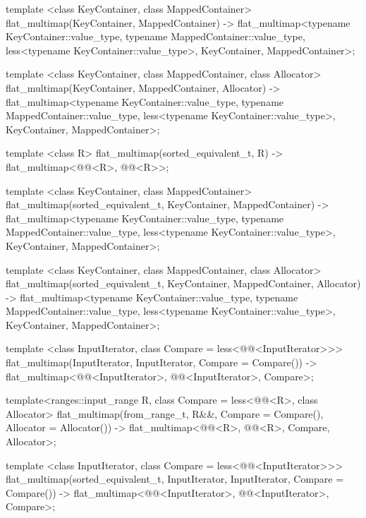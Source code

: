 \begin{addedblock}
\begin{codeblock}
{  template <class KeyContainer, class MappedContainer>
    flat_multimap(KeyContainer, MappedContainer)
      -> flat_multimap<typename KeyContainer::value_type,
                       typename MappedContainer::value_type,
                       less<typename KeyContainer::value_type>,
                       KeyContainer, MappedContainer>;

  template <class KeyContainer, class MappedContainer, class Allocator>
    flat_multimap(KeyContainer, MappedContainer, Allocator)
      -> flat_multimap<typename KeyContainer::value_type,
                       typename MappedContainer::value_type,
                       less<typename KeyContainer::value_type>,
                       KeyContainer, MappedContainer>;

  template <class R>
    flat_multimap(sorted_equivalent_t, R)
      -> flat_multimap<@@<R>, @@<R>>;

  template <class KeyContainer, class MappedContainer>
    flat_multimap(sorted_equivalent_t, KeyContainer, MappedContainer)
      -> flat_multimap<typename KeyContainer::value_type,
                       typename MappedContainer::value_type,
                       less<typename KeyContainer::value_type>,
                       KeyContainer, MappedContainer>;

  template <class KeyContainer, class MappedContainer, class Allocator>
    flat_multimap(sorted_equivalent_t, KeyContainer, MappedContainer, Allocator)
      -> flat_multimap<typename KeyContainer::value_type,
                       typename MappedContainer::value_type,
                       less<typename KeyContainer::value_type>,
                       KeyContainer, MappedContainer>;

  template <class InputIterator, class Compare = less<@@<InputIterator>>>
    flat_multimap(InputIterator, InputIterator, Compare = Compare())
      -> flat_multimap<@@<InputIterator>, @@<InputIterator>, Compare>;

  template<ranges::input_range R, class Compare = less<@@<R>,
           class Allocator>
    flat_multimap(from_range_t, R&&, Compare = Compare(), Allocator = Allocator())
      -> flat_multimap<@@<R>, @@<R>, Compare, Allocator>;

  template <class InputIterator, class Compare = less<@@<InputIterator>>>
    flat_multimap(sorted_equivalent_t, InputIterator, InputIterator,
                  Compare = Compare())
      -> flat_multimap<@@<InputIterator>, @@<InputIterator>, Compare>;

}
\end{codeblock}
\end{addedblock}
